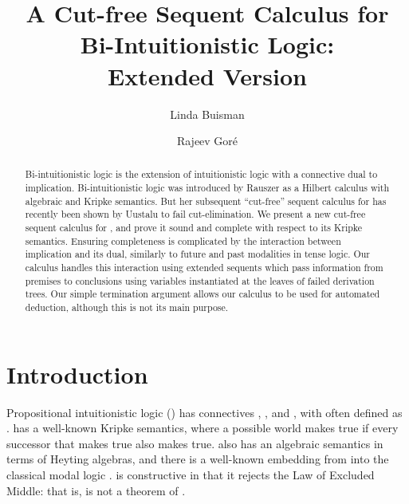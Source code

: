 \documentclass{llncs}
\numberwithin{equation}{section}
\begin{document}
\title{A Cut-free Sequent Calculus for\\  Bi-Intuitionistic Logic: \\ Extended Version}
\author{Linda Buisman \and Rajeev Gor\'{e}}
\maketitle

\begin{abstract}
  Bi-intuitionistic logic is the extension of intuitionistic logic
  with a connective dual to implication. Bi-intuitionistic logic was
  introduced by Rauszer as a Hilbert calculus with algebraic and
  Kripke semantics. But her subsequent ``cut-free'' sequent calculus
  for  has recently been shown by Uustalu to fail
  cut-elimination.  We present a new cut-free sequent calculus for
  , and prove it sound and complete with respect to its Kripke
  semantics. Ensuring completeness is complicated by the interaction between
  implication and its dual, similarly to future and past modalities in
  tense logic. Our calculus handles this interaction using extended sequents
  which pass information from premises to conclusions using variables
  instantiated at the leaves of failed derivation trees.
  Our simple termination argument allows our calculus to be used for
  automated deduction, although this is not its main purpose.
\end{abstract}

\section{Introduction}

Propositional intuitionistic logic () has connectives , ,  and , with  often defined as .  has a well-known Kripke semantics, where a possible world  makes  true if every successor  that makes  true also makes  true.  also has an algebraic semantics in terms of Heyting algebras, and there is a well-known embedding from  into the classical modal logic .  is constructive in that it rejects the Law of Excluded Middle: that is,  is not a theorem of .
\end{document}
